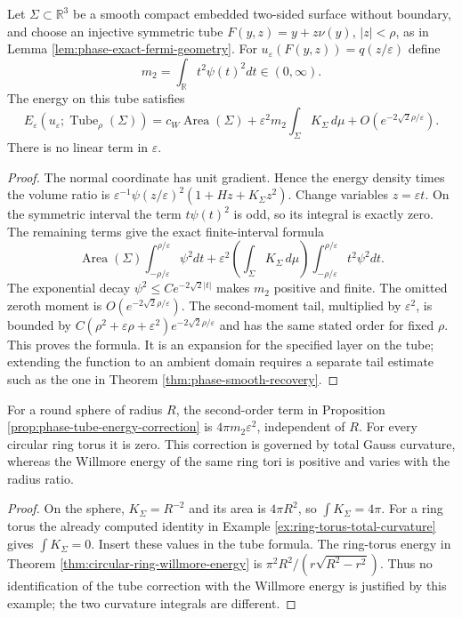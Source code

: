 \begin{proposition}\label{prop:phase-tube-energy-correction}
Let $\Sigma\subset\mathbb R^3$ be a smooth compact embedded two-sided surface without boundary, and choose an injective symmetric tube $F(y,z)=y+z\nu(y)$, $|z|<\rho$, as in Lemma \ref{lem:phase-exact-fermi-geometry}. For $u_\varepsilon(F(y,z))=q(z/\varepsilon)$ define
\[
 m_2=\int_{\mathbb R}t^2\psi(t)^2dt\in(0,\infty).
\]
The energy on this tube satisfies
\[
 E_\varepsilon(u_\varepsilon;\operatorname{Tube}_\rho(\Sigma))
 =c_W\operatorname{Area}(\Sigma)
   +\varepsilon^2m_2\int_\Sigma K_\Sigma\,d\mu
   +O(e^{-2\sqrt2\rho/\varepsilon}).
\]
There is no linear term in $\varepsilon$.
\end{proposition}
\begin{proof}
The normal coordinate has unit gradient. Hence the energy density times the volume ratio is
$\varepsilon^{-1}\psi(z/\varepsilon)^2(1+Hz+K_\Sigma z^2)$.
Change variables $z=\varepsilon t$. On the symmetric interval the term $t\psi(t)^2$ is odd, so its integral is exactly zero. The remaining terms give the exact finite-interval formula
\[
 \operatorname{Area}(\Sigma)\int_{-\rho/\varepsilon}^{\rho/\varepsilon}\psi^2dt
 +\varepsilon^2\left(\int_\Sigma K_\Sigma\,d\mu\right)
     \int_{-\rho/\varepsilon}^{\rho/\varepsilon}t^2\psi^2dt.
\]
The exponential decay $\psi^2\leq Ce^{-2\sqrt2|t|}$ makes $m_2$ positive and finite. The omitted zeroth moment is $O(e^{-2\sqrt2\rho/\varepsilon})$. The second-moment tail, multiplied by $\varepsilon^2$, is bounded by $C(\rho^2+\varepsilon\rho+\varepsilon^2)e^{-2\sqrt2\rho/\varepsilon}$ and has the same stated order for fixed $\rho$. This proves the formula. It is an expansion for the specified layer on the tube; extending the function to an ambient domain requires a separate tail estimate such as the one in Theorem \ref{thm:phase-smooth-recovery}.
\end{proof}

\begin{example}\label{ex:phase-sphere-torus-corrections}
For a round sphere of radius $R$, the second-order term in Proposition \ref{prop:phase-tube-energy-correction} is $4\pi m_2\varepsilon^2$, independent of $R$. For every circular ring torus it is zero. This correction is governed by total Gauss curvature, whereas the Willmore energy of the same ring tori is positive and varies with the radius ratio.
\end{example}
\begin{proof}
On the sphere, $K_\Sigma=R^{-2}$ and its area is $4\pi R^2$, so $\int K_\Sigma=4\pi$. For a ring torus the already computed identity in Example \ref{ex:ring-torus-total-curvature} gives $\int K_\Sigma=0$. Insert these values in the tube formula. The ring-torus energy in Theorem \ref{thm:circular-ring-willmore-energy} is $\pi^2R^2/(r\sqrt{R^2-r^2})$. Thus no identification of the tube correction with the Willmore energy is justified by this example; the two curvature integrals are different.
\end{proof}


